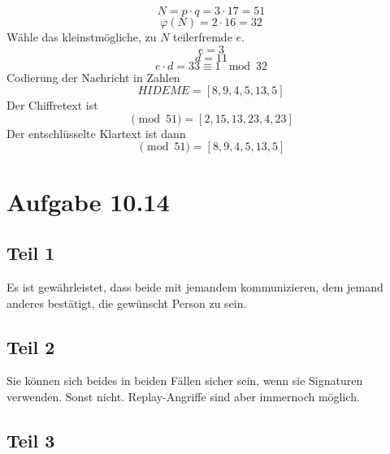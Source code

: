 \documentclass[10pt,a4paper]{article}
\begin{document}
\begin{equation}
  N = p \cdot q = 3 \cdot 17 = 51
\end{equation}
\begin{equation}
  \varphi(N) = 2 \cdot 16 = 32
\end{equation}
Wähle das kleinstmögliche, zu $N$ teilerfremde $e$.
\begin{equation}
  e = 3
\end{equation}
\begin{equation}
  d = 11
\end{equation}
\begin{equation}
  e \cdot d = 33 \equiv 1 \mod{32}
\end{equation}
Codierung der Nachricht in Zahlen
\begin{equation}
  HIDEME = [8, 9, 4, 5, 13, 5]
\end{equation}
Der Chiffretext ist
\begin{equation}
  [8^3, 9^3, 4^3, 5^3, 13^3, 5^3] \pmod{51} = [2, 15, 13, 23, 4, 23]
\end{equation}
Der entschlüsselte Klartext ist dann
\begin{equation}
  [2^{11}, 15^{11}, 13^{11}, 23^{11}, 4^{11}, 23^{11}] \pmod{51} = [8, 9, 4, 5, 13, 5]
\end{equation}

\section{Aufgabe 10.14}

\subsection{Teil 1}

Es ist gewährleistet, dass beide mit jemandem kommunizieren, dem jemand anderes
bestätigt, die gewünscht Person zu sein.

\subsection{Teil 2}

Sie können sich beides in beiden Fällen sicher sein, wenn sie Signaturen verwenden. Sonst
nicht. Replay-Angriffe sind aber immernoch möglich.

\subsection{Teil 3}
\end{document}

